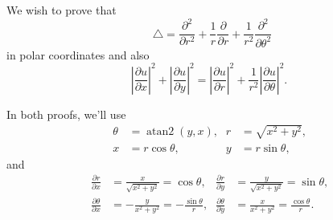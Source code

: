 \documentclass[oneside]{article}
\newcommand\abs[1]{\left|#1\right|}
\newcommand*\Laplace{\mathop{}\!\mathbin\bigtriangleup}
\DeclareMathOperator{\atantwo}{atan2}
\begin{document}
We wish to prove that\begin{equation}
  \label{eq:laplace}
  \Laplace = \frac{\partial^2}{\partial r^2}
             + \frac{1}{r}\frac{\partial}{\partial r}
             + \frac{1}{r^2}\frac{\partial^2}{\partial\theta^2}
\end{equation}in polar coordinates and also\begin{equation}
  \label{eq:other-thing}
  \abs{\frac{\partial u}{\partial x}}^2
  + \abs{\frac{\partial u}{\partial y}}^2
  = \abs{\frac{\partial u}{\partial r}}^2
  + \frac{1}{r^2}\abs{\frac{\partial u}{\partial\theta}}^2 \text{.}
\end{equation}

In both proofs, we'll use\begin{align*}
  \theta &= \atantwo(y, x) \text{,}&
   r &= \sqrt{x^2 + y^2} \text{,} \\
  x &= r\cos\theta \text{,}&
   y &= r\sin\theta \text{,}
\end{align*}and\begin{align*}
  \frac{\partial r}{\partial x}
  &= \frac{x}{\sqrt{x^2+y^2}}
  = \cos\theta\text{,}&
  \frac{\partial r}{\partial y}
  &= \frac{y}{\sqrt{x^2+y^2}}
  = \sin\theta\text{,}
  \\
  \frac{\partial\theta}{\partial x}
  &= -\frac{y}{x^2 + y^2}
  = -\frac{\sin\theta}{r} \text{,}&
  \frac{\partial\theta}{\partial y}
  &= \frac{x}{x^2 + y^2}
  = \frac{\cos\theta}{r} \text{.}
\end{align*}
\end{document}
